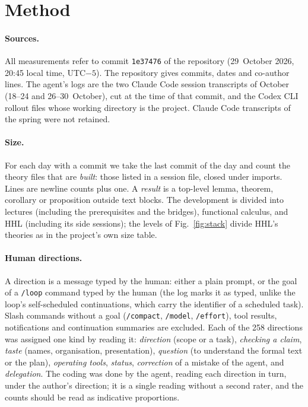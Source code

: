 \section{Method}\label{app:method}

\paragraph{Sources.} All measurements refer to commit \texttt{1e37476} of the repository (29~October
2026, 20:45 local time, UTC$-5$). The repository gives commits, dates and co-author lines. The agent's
logs are the two Claude Code session transcripts of October (18--24 and 26--30~October), cut at the time
of that commit, and the Codex CLI rollout files whose working directory is the project. Claude Code
transcripts of the spring were not retained.

\paragraph{Size.} For each day with a commit we take the last commit of the day and count the theory
files that are \emph{built}: those listed in a session file, closed under imports. Lines are newline
counts plus one. A \emph{result} is a top-level \textsf{lemma}, \textsf{theorem}, \textsf{corollary} or
\textsf{proposition} outside \textsf{text} blocks. The development is divided into lectures (including the
prerequisites and the bridges), functional calculus, and HHL (including its side sessions); the levels of
Fig.~\ref{fig:stack} divide HHL's theories as in the project's own size table.

\paragraph{Human directions.} A direction is a message typed by the human: either a plain prompt, or the
goal of a \texttt{/loop} command typed by the human (the log marks it as typed, unlike the loop's
self-scheduled continuations, which carry the identifier of a scheduled task). Slash commands without a
goal (\texttt{/compact}, \texttt{/model}, \texttt{/effort}), tool results, notifications and
continuation summaries are excluded. Each of the 258 directions was assigned one kind by reading it:
\emph{direction} (scope or a task), \emph{checking a claim}, \emph{taste} (names, organisation,
presentation), \emph{question} (to understand the formal text or the plan), \emph{operating tools},
\emph{status}, \emph{correction} of a mistake of the agent, and \emph{delegation}. The coding was done
by the agent, reading each direction in turn, under the author's direction; it is a single reading
without a second rater, and the counts should be read as indicative proportions.

